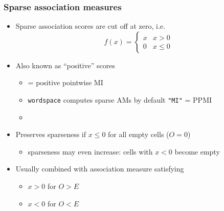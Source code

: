 \documentclass[t]{beamer} %
\begin{document}
\begin{frame}
  \frametitle{Sparse association measures}

  \begin{itemize}
  \item Sparse association scores are cut off at zero, i.e.\
    \[
    f(x) =
    \begin{cases}
      x & x > 0 \\
      0 & x \leq 0
    \end{cases}
    \]
  \item Also known as ``positive'' scores
    \begin{itemize}
    \item {} = positive pointwise MI \citep[e.g.][]{Bullinaria:Levy:07}
    \item \texttt{wordspace} computes sparse AMs by default \so \texttt{"MI"} = PPMI
    \item[]
    \end{itemize}
  \item<2-> Preserves sparseness if $x \leq 0$ for all empty cells ($O = 0$)
    \begin{itemize}
    \item sparseness may even increase: cells with $x < 0$ become empty
    \end{itemize}
  \item<2-> Usually combined with  association measure satisfying
    \begin{itemize}
    \item $x > 0$ for $O > E$
    \item $x < 0$ for $O < E$
    \end{itemize}
  \end{itemize}
\end{frame}
\end{document}
